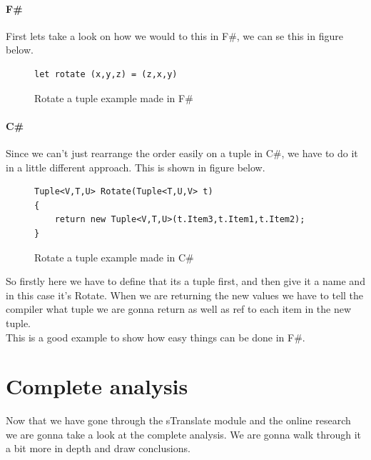 \documentclass[12pt, a4paper]{article}
\begin{document}
\paragraph{F\#}
First lets take a look on how we would to this in F\#, we can se this in figure below.

\begin{figure}[!h]
\begin{lstlisting}
let rotate (x,y,z) = (z,x,y)
\end{lstlisting}
\caption{Rotate a tuple example made in F\#}
\label{fig:RotateTupleFSharp}
\end{figure}

\paragraph{C\#}
Since we can’t just rearrange the order easily on a tuple in C\#, we have to do it in a little different approach. This is shown in figure below.\\

\begin{figure}[!h]
\begin{lstlisting}
Tuple<V,T,U> Rotate(Tuple<T,U,V> t) 
{ 
    return new Tuple<V,T,U>(t.Item3,t.Item1,t.Item2); 
}
\end{lstlisting}
\caption{Rotate a tuple example made in C\#}
\label{fig:RotateTupleCSharp}
\end{figure}

So firstly here we have to define that its a tuple first, and then give it a name and in this case it’s Rotate. When we are returning the new values we have to tell the compiler what tuple we are gonna return as well as ref to each item in the new tuple.\\

This is a good example to show how easy things can be done in F\#.

\newpage
\section{Complete analysis}

Now that we have gone through the sTranslate module and the online research we are gonna take a look at the complete analysis. We are gonna walk through it a bit more in depth and draw conclusions.


\end{document}
